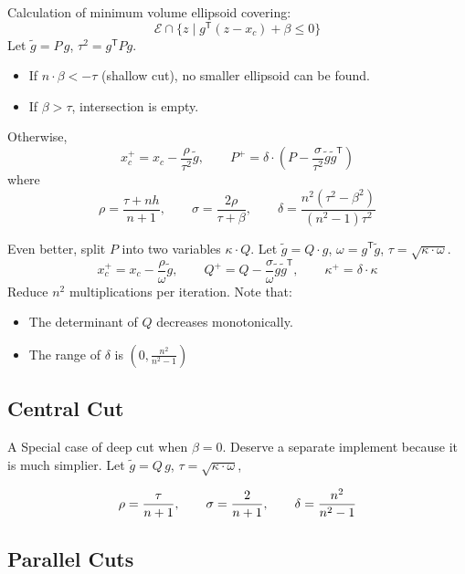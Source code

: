 \documentclass[final,leqno]{siamltex}
\providecommand{\tightlist}{%
  \setlength{\itemsep}{0pt}\setlength{\parskip}{0pt}}
\begin{document}
Calculation of minimum volume ellipsoid covering:
\[\mathcal{E} \cap \{z \mid g^\mathsf{T} (z - x_c) + \beta \leq 0 \}
\]
Let \(\tilde{g} = P\,g\), \(\tau^2 = g^\mathsf{T} P g\).

\begin{itemize}
\tightlist
\item
  If \(n \cdot \beta < -\tau\) (shallow cut), no smaller ellipsoid can be found.
\item
  If \(\beta > \tau\), intersection is empty.
\end{itemize}

Otherwise,
\[x_c^+ = x_c - \frac{\rho}{ \tau^2 } \tilde{g}, \qquad
  P^+ = \delta\cdot\left(P - \frac{\sigma}{ \tau^2 } \tilde{g}\tilde{g}^\mathsf{T}\right)
\]
where
\[\rho = \frac{ \tau+nh}{n+1}, \qquad
  \sigma = \frac{2\rho}{ \tau+\beta}, \qquad
  \delta = \frac{n^2(\tau^2 - \beta^2)}{(n^2 - 1)\tau^2}
\]

Even better, split \(P\) into two variables \(\kappa \cdot Q\).
Let \(\tilde{g} = Q \cdot g\), \(\omega = g^\mathsf{T}\tilde{g}\), \(\tau = \sqrt{\kappa\cdot\omega}\).
\[x_c^+ = x_c - \frac{\rho}{\omega} \tilde{g}, \qquad
  Q^+ = Q - \frac{\sigma}{\omega} \tilde{g}\tilde{g}^\mathsf{T}, \qquad
  \kappa^+ =  \delta\cdot\kappa
\]
Reduce \(n^2\) multiplications per iteration.
Note that:

\begin{itemize}
\tightlist
\item
  The determinant of \(Q\) decreases monotonically.
\item
  The range of \(\delta\) is \((0, \frac{n^2}{n^2 - 1})\)
\end{itemize}

\hypertarget{sec:central-cut}{%
\subsection{Central Cut}\label{sec:central-cut}}

A Special case of deep cut when \(\beta = 0\).
Deserve a separate implement because it is much simplier.
Let \(\tilde{g} = Q\,g\), \(\tau = \sqrt{\kappa\cdot\omega}\),

\[\rho = {\tau \over n+1}, \qquad
  \sigma = {2 \over n+1}, \qquad
  \delta = {n^2 \over n^2 - 1}
\]

\hypertarget{sec:parallel-cuts}{%
\subsection{Parallel Cuts}\label{sec:parallel-cuts}}
\end{document}
